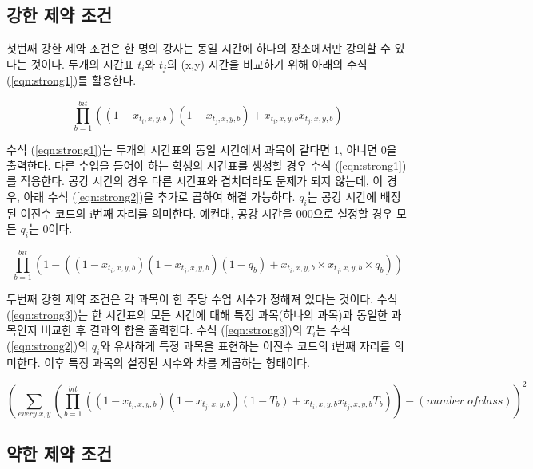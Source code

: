 \documentclass[12pt,a4paper]{article}
\begin{document}
    \subsection{강한 제약 조건}

    첫번째 강한 제약 조건은 한 명의 강사는 동일 시간에 하나의 장소에서만 강의할 수 있다는 것이다. 두개의 시간표 $t_{i}$와 $t_{j}$의 (x,y) 시간을 비교하기 위해 아래의 수식 (\ref{eqn:strong1})를 활용한다.

    \begin{equation}\label{eqn:strong1}
        \prod_{b=1}^{bit}((1-x_{t_{i},x,y,b} )(1-x_{t_{j},x,y,b})+x_{t_{i},x,y,b} x_{t_{j},x,y,b} )
    \end{equation}

    수식 (\ref{eqn:strong1})는 두개의 시간표의 동일 시간에서 과목이 같다면 1, 아니면 0을 출력한다. 다른 수업을 들어야 하는 학생의 시간표를 생성할 경우 수식 (\ref{eqn:strong1})를 적용한다. 공강 시간의 경우 다른 시간표와 겹치더라도 문제가 되지 않는데, 이 경우, 아래 수식 (\ref{eqn:strong2})을 추가로 곱하여 해결 가능하다. $q_{i}$는 공강 시간에 배정된 이진수 코드의 i번째 자리를 의미한다. 예컨대, 공강 시간을 000으로 설정할 경우 모든 $q_{i}$는 0이다.

    \begin{equation}\label{eqn:strong2}
        \prod_{b=1}^{bit}(1-((1-x_{t_{i},x,y,b} )(1-x_{t_{j},x,y,b} )(1-q_{b} )+ x_{t_{i},x,y,b}\times x_{t_{j},x,y,b} \times q_{b} )) 
    \end{equation}

    두번째 강한 제약 조건은 각 과목이 한 주당 수업 시수가 정해져 있다는 것이다. 수식 (\ref{eqn:strong3})는 한 시간표의 모든 시간에 대해 특정 과목(하나의 과목)과 동일한 과목인지 비교한 후 결과의 합을 출력한다. 수식 (\ref{eqn:strong3})의 $T_{i}$는 수식 (\ref{eqn:strong2})의 $q_{i}$와 유사하게 특정 과목을 표현하는 이진수 코드의 i번째 자리를 의미한다. 이후 특정 과목의 설정된 시수와 차를 제곱하는 형태이다.

    \begin{equation}\label{eqn:strong3}
        \left( \sum_{every\;x,y} \left( \prod_{b=1}^{bit}((1-x_{t_{i},x,y,b} )(1-x_{t_{j},x,y,b} )(1-T_{b})+x_{t_{i},x,y,b} x_{t_{j},x,y,b} T_{b} ) \right) -(number\;of class)\right )^{2}
    \end{equation}

    \subsection{약한 제약 조건}
\end{document}
